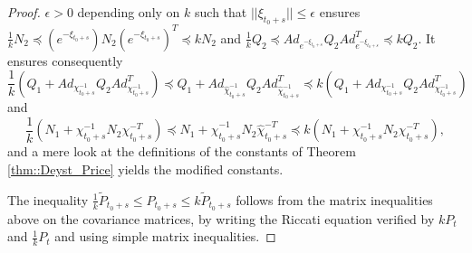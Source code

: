 \documentclass[a4paper,12pt,onecolumn]{article}
\begin{document}
\begin{proof}
$\epsilon>0$ depending only on $k$  such that $|| \xi_{t_0+s} || \leq \epsilon$ ensures $ \frac{1}{{k}} N_2 \preceq  \left( e^{-\xi_{t_0+s}} \right) N_2 \left( e^{-\xi_{t_0+s}} \right)^T \preceq {k} N_2$ and $\frac{1}{{k}} Q_2 \preceq Ad_{e^{-\xi_{t_0+s}}} Q_2 Ad_{e^{-\xi_{t_0+s}}}^T \preceq {k} Q_2$. It ensures consequently $$ \frac{1}{k} \left( Q_1 + Ad_{\chi_{t_0+s}^{-1}} Q_2 Ad_{\chi_{t_0+s}^{-1}}^T \right) \preceq Q_1 + Ad_{\hat{\chi}_{t_0+s}^{-1}} Q_2 Ad_{\hat{\chi}_{t_0+s}^{-1}}^T \preceq  k \left( Q_1 + Ad_{\chi_{t_0+s}^{-1}} Q_2 Ad_{\chi_{t_0+s}^{-1}}^T \right) $$ and $$ \frac{1}{k} \left( N_1 + \chi_{t_0+s}^{-1} N_2 \chi_{t_0+s}^{-T} \right) \preceq N_1 + \hat \chi_{t_0+s}^{-1} N_2\hat \chi_{t_0+s}^{-T} \preceq  k \left( N_1 + \chi_{t_0+s}^{-1} N_2 \chi_{t_0+s}^{-T} \right), $$ and a mere look at the definitions of the constants of Theorem \ref{thm::Deyst_Price} yields the modified constants.

The inequality $\frac{1}{k} \tilde{P}_{t_0+s} \leq P_{t_0+s} \leq k \tilde{P}_{t_0+s}$ follows from the matrix inequalities above on the covariance matrices, by writing the Riccati equation verified by $k P_t$ and $\frac{1}{k} P_t$ and using simple matrix inequalities. 

\end{proof}
\end{document}
